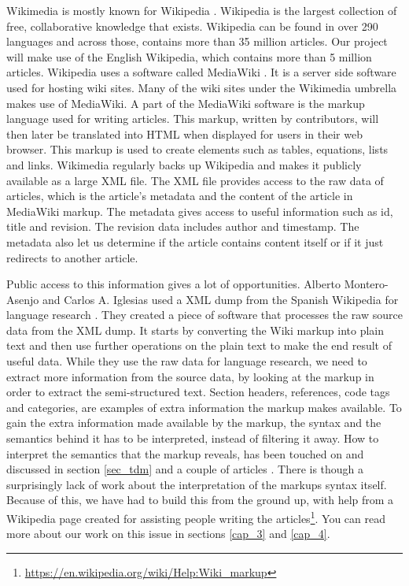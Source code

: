 Wikimedia is mostly known for Wikipedia \cite{wikipedia}. Wikipedia is the largest collection of free, collaborative knowledge that exists. Wikipedia can be found in over 290 languages and across those, contains more than 35 million articles. Our project will make use of the English Wikipedia, which contains more than 5 million articles. Wikipedia uses a  software called MediaWiki \cite{mediawiki}. It is a server side software used for hosting wiki sites. Many of the wiki sites under the Wikimedia umbrella makes use of MediaWiki. A part of the MediaWiki software is the markup language used for writing articles. This markup, written by contributors, will then later be translated into HTML when displayed for users in their web browser. This markup is used to create elements such as tables, equations, lists and links. Wikimedia regularly backs up Wikipedia and makes it publicly available as a large XML file. The XML file provides access to the raw data of articles, which is the article's metadata and the content of the article in MediaWiki markup. The metadata gives access to useful information such as id, title and revision. The revision data includes author and timestamp. The metadata also let us determine if the article contains content itself or if it just redirects to another article.

Public access to this information gives a lot of opportunities. Alberto Montero-Asenjo and Carlos A. Iglesias used a XML dump from the Spanish Wikipedia for language research \cite{lr-wiki}. They created a piece of software that processes the raw source data from the XML dump. It starts by converting the Wiki markup into plain text and then use further operations on the plain text to make the end result of useful data. While they use the raw data for language research, we need to extract more information from the source data, by looking at the markup in order to extract the semi-structured text. Section headers, references, code tags and categories, are examples of extra information the markup makes available. 
To gain the extra information made available by the markup, the syntax and the semantics behind it has to be interpreted, instead of filtering it away.
How to interpret the semantics that the markup reveals, has been touched on and discussed in section \ref{sec_tdm} and a couple of articles \cite{text-cat} \cite{wlm}. There is though a surprisingly lack of work about the interpretation of the markups syntax itself. Because of this, we have had to build this from the ground up, with help from a Wikipedia page created for assisting people writing the articles\footnote{\url{https://en.wikipedia.org/wiki/Help:Wiki_markup}}. You can read more about our work on this issue in sections \ref{cap_3} and \ref{cap_4}.

